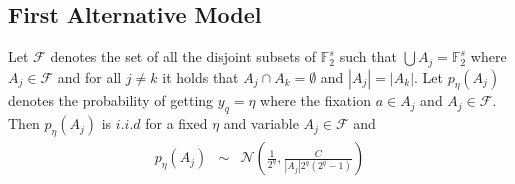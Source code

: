 \subsection{First Alternative Model}
\begin{corollary} 
Let $\mathcal{F}$ denotes the set of all the disjoint subsets of $\mathbb{F}_{2}^{s}$ such that $\bigcup A_j = \mathbb{F}_{2}^{s}$ where $A_j \in \mathcal{F}$ and for all $j \neq k$ it holds that $A_j \cap A_k = \emptyset$ and $|A_j|=|A_k|$. Let $p_{\eta}(A_j)$ denotes the probability of getting $y_q = \eta$ where the fixation $a \in A_j$ and $A_j \in \mathcal{F}$. Then $p_{\eta}(A_j)$ is $i.i.d$ for a fixed $\eta$ and variable $A_j \in \mathcal{F}$ and 
\begin{eqnarray*}
p_{\eta}(A_j) &\sim & \mathcal{N}\left(\frac{1}{2^q},\frac{C}{|A_j|2^q(2^q-1)}\right)
\end{eqnarray*}
\end{corollary}

